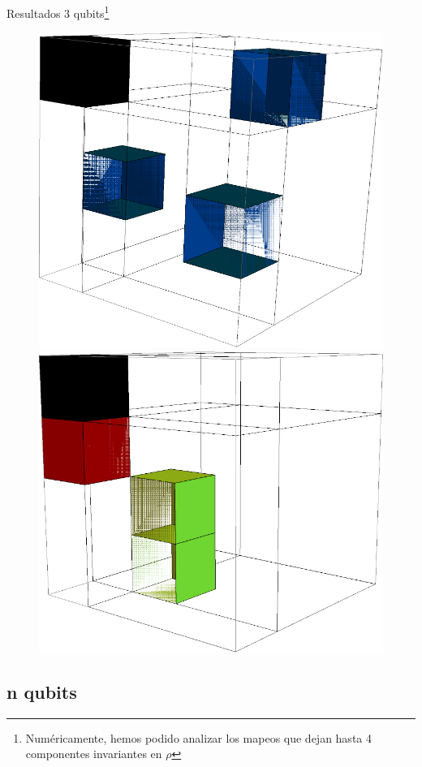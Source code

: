 \documentclass[11pt,xcolor=dvipsnames]{beamer}
\begin{document}
\begin{frame}{Resultados 3 qubits\footnote{Numéricamente, hemos podido analizar
los mapeos que dejan hasta 4 componentes invariantes en $\rho$}}
\begin{figure}
		\includegraphics[width=.2\textwidth]{img-congreso/3q-4c-3} \hfill
 		\includegraphics[width=.2\textwidth]{img-congreso/3q-4c-4} \hfill
	\end{figure}
\end{frame}


\subsection{n qubits}
%	
\end{document}
